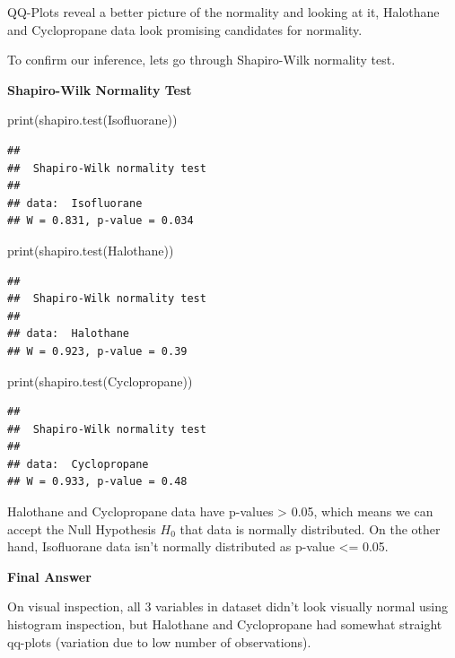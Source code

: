 \documentclass[
]{article}
\newenvironment{Shaded}{\begin{snugshade}}{\end{snugshade}}
\newcommand{\FunctionTok}[1]{\textcolor[rgb]{0.00,0.00,0.00}{#1}}
\newcommand{\NormalTok}[1]{#1}
\begin{document}
QQ-Plots reveal a better picture of the normality and looking at it,
Halothane and Cyclopropane data look promising candidates for normality.

To confirm our inference, lets go through Shapiro-Wilk normality test.

\textbf{Shapiro-Wilk Normality Test}

\begin{Shaded}
\begin{Highlighting}[]
\FunctionTok{print}\NormalTok{(}\FunctionTok{shapiro.test}\NormalTok{(Isofluorane))}
\end{Highlighting}
\end{Shaded}

\begin{verbatim}
## 
##  Shapiro-Wilk normality test
## 
## data:  Isofluorane
## W = 0.831, p-value = 0.034
\end{verbatim}

\begin{Shaded}
\begin{Highlighting}[]
\FunctionTok{print}\NormalTok{(}\FunctionTok{shapiro.test}\NormalTok{(Halothane))}
\end{Highlighting}
\end{Shaded}

\begin{verbatim}
## 
##  Shapiro-Wilk normality test
## 
## data:  Halothane
## W = 0.923, p-value = 0.39
\end{verbatim}

\begin{Shaded}
\begin{Highlighting}[]
\FunctionTok{print}\NormalTok{(}\FunctionTok{shapiro.test}\NormalTok{(Cyclopropane))}
\end{Highlighting}
\end{Shaded}

\begin{verbatim}
## 
##  Shapiro-Wilk normality test
## 
## data:  Cyclopropane
## W = 0.933, p-value = 0.48
\end{verbatim}

Halothane and Cyclopropane data have p-values \textgreater{} 0.05, which
means we can accept the Null Hypothesis \(H_0\) that data is normally
distributed. On the other hand, Isofluorane data isn't normally
distributed as p-value \textless= 0.05.

\textbf{Final Answer}

On visual inspection, all 3 variables in dataset didn't look visually
normal using histogram inspection, but Halothane and Cyclopropane had
somewhat straight qq-plots (variation due to low number of
observations).
\end{document}
